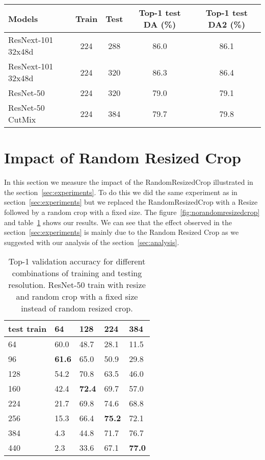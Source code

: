 \begin{table*}
\centering
\small
\begin{tabular}{lcccc}
    \toprule 
    Models & Train  & Test & Top-1 test DA (\%) & Top-1 test DA2 (\%) \\
    \midrule
    ResNext-101 32x48d  & 224 & 288 & 86.0 & 86.1 \\
    ResNext-101 32x48d & 224 & 320 & 86.3 & 86.4 \\
    \midrule
    ResNet-50  & 224 & 320 & 79.0 & 79.1 \\
    \midrule
    ResNet-50 CutMix & 224 & 384 & 79.7 & 79.8  \\
    \bottomrule
\end{tabular}
\smallskip
\caption{\label{tab:dataaugmentationcomparison}
Comparisons of performance between data-augmentation test DA and test DA2 in the case of fine-tuning batch-norm and classifier.
}
\end{table*}


\section{Impact of Random Resized Crop}
\label{sec:RandomResizedCropEffect}
In this section we measure the impact of the RandomResizedCrop illustrated in the section~\ref{sec:experiments}.
To do this we did the same experiment as in section~\ref{sec:experiments} but we replaced the RandomResizedCrop with a Resize followed by a random crop with a fixed size.
The figure~\ref{fig:norandomresizedcrop} and table~\ref{tab:norandomresizedcrop} shows our results. 
We can see that the effect observed in the section~\ref{sec:experiments} is mainly due to the Random Resized Crop as we suggested with our analysis of the section~\ref{sec:analysis}.

\begin{table}
  \centering
  \begin{tabular}{l|llll}
    \toprule
    test  train     & 64 & 128 & 224 & 384 \\
    \midrule
    64 & 60.0 & 48.7 & 28.1 & 11.5 \\
    96 & \textbf{61.6} & 65.0 & 50.9 & 29.8 \\
    128 & 54.2 & 70.8 & 63.5 & 46.0 \\
    160 & 42.4 & \textbf{72.4} & 69.7 & 57.0 \\
    224 & 21.7 & 69.8 & 74.6 & 68.8 \\
    256 & 15.3 & 66.4 & \textbf{75.2} & 72.1 \\
    384 & 4.3 & 44.8 & 71.7 & 76.7 \\
    440 & 2.3 & 33.6 & 67.1 & \textbf{77.0} \\
    \bottomrule
\end{tabular}
\caption{\label{tab:norandomresizedcrop}
	Top-1 validation accuracy for different combinations of training and testing resolution. 
ResNet-50 train with resize and random crop with a fixed size instead of random resized crop.
}
\end{table}

